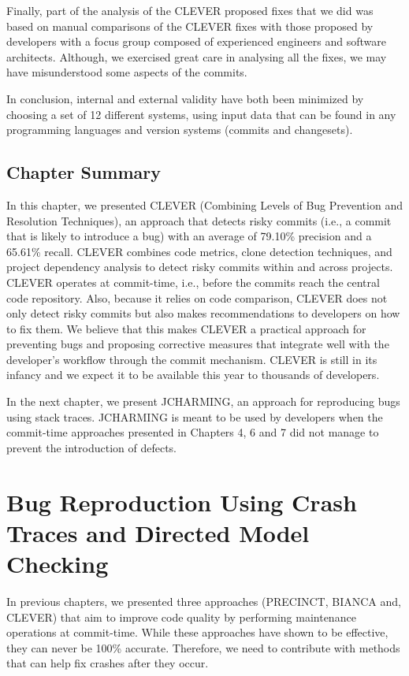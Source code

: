 \documentclass[12pt]{report}
\begin{document}
Finally, part of the analysis of the CLEVER proposed fixes that we did
was based on manual comparisons of the CLEVER fixes with those proposed
by developers with a focus group composed of experienced engineers and
software architects. Although, we exercised great care in analysing all
the fixes, we may have misunderstood some aspects of the commits.

In conclusion, internal and external validity have both been minimized
by choosing a set of 12 different systems, using input data that can be
found in any programming languages and version systems (commits and
changesets).

\section{Chapter Summary}\label{chapter-summary-3}

In this chapter, we presented CLEVER (Combining Levels of Bug Prevention
and Resolution Techniques), an approach that detects risky commits
(i.e., a commit that is likely to introduce a bug) with an average of
79.10\% precision and a 65.61\% recall. CLEVER combines code metrics,
clone detection techniques, and project dependency analysis to detect
risky commits within and across projects. CLEVER operates at
commit-time, i.e., before the commits reach the central code repository.
Also, because it relies on code comparison, CLEVER does not only detect
risky commits but also makes recommendations to developers on how to fix
them. We believe that this makes CLEVER a practical approach for
preventing bugs and proposing corrective measures that integrate well
with the developer's workflow through the commit mechanism. CLEVER is
still in its infancy and we expect it to be available this year to
thousands of developers.

In the next chapter, we present JCHARMING, an approach for reproducing bugs
using stack traces. JCHARMING is meant to be used
by developers when the commit-time approaches presented in Chapters 4, 6
and 7 did not manage to prevent the introduction of defects.

\chapter{Bug Reproduction Using Crash Traces and Directed Model
Checking}\label{bug-reproduction-using-crash-traces-and-directed-model-checking}

In previous chapters, we presented three approaches (PRECINCT, BIANCA
and, CLEVER) that aim to improve code quality by performing
maintenance operations at commit-time. While these approaches have shown
to be effective, they can never be 100\% accurate. Therefore, we need to contribute with methods that can help fix crashes after they occur.
\end{document}
